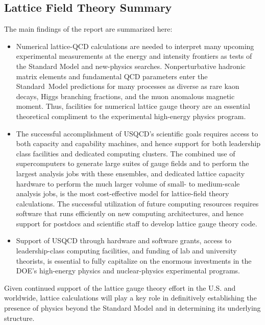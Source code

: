 \subsection{Lattice Field Theory Summary}

The main findings of the report are summarized here:

\begin{itemize}

\item Numerical lattice-QCD calculations are needed to interpret many upcoming
experimental measurements at the energy and intensity frontiers as tests of
the Standard Model and new-physics searches.  Nonperturbative hadronic matrix
elements and fundamental QCD parameters enter the Standard~Model predictions
for many processes as diverse as rare kaon decays, Higgs branching fractions,
and the muon anomalous magnetic moment.  Thus, facilities for numerical
lattice gauge theory are an essential theoretical compliment to the
experimental high-energy physics program.

\item The successful accomplishment of USQCD's scientific goals requires
access to both capacity and capability machines, and hence support for both
leadership class facilities and dedicated computing clusters.  The combined
use of supercomputers to generate large suites of gauge fields and to perform
the largest analysis jobs with these ensembles, and dedicated lattice capacity
hardware to perform the much larger volume of small- to medium-scale analysis
jobs, is the most cost-effective model for lattice-field theory calculations.
The successful utilization of future computing resources requires software
that runs efficiently on new computing architectures, and hence support for
postdocs and scientific staff to develop lattice gauge theory code.

\item Support of USQCD through hardware and software grants, access to
leadership-class computing facilities, and funding of lab and university
theorists, is essential to fully capitalize on the enormous investments in the
DOE's high-energy physics and nuclear-physics experimental programs.

\end{itemize}

Given continued support of the lattice gauge theory effort in the U.S. and
worldwide, lattice calculations will play a key role in definitively
establishing the presence of physics beyond the Standard Model and in
determining its underlying structure.

